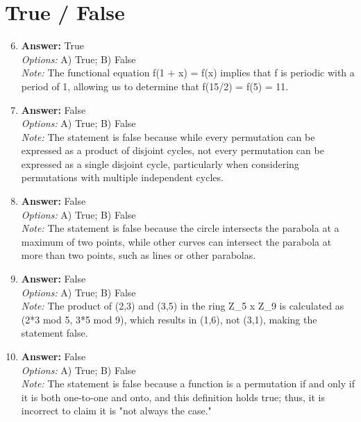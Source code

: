 \documentclass[12pt]{article}
\begin{document}
\section*{True / False}
\begin{enumerate}[label=\arabic*.]
\setcounter{enumi}{5}
\item \textbf{Answer:} True
\\ \textit{Options:} A) True; B) False
\\ \textit{Note:} The functional equation f(1 + x) = f(x) implies that f is periodic with a period of 1, allowing us to determine that f(15/2) = f(5) = 11.
\item \textbf{Answer:} False
\\ \textit{Options:} A) True; B) False
\\ \textit{Note:} The statement is false because while every permutation can be expressed as a product of disjoint cycles, not every permutation can be expressed as a single disjoint cycle, particularly when considering permutations with multiple independent cycles.
\item \textbf{Answer:} False
\\ \textit{Options:} A) True; B) False
\\ \textit{Note:} The statement is false because the circle intersects the parabola at a maximum of two points, while other curves can intersect the parabola at more than two points, such as lines or other parabolas.
\item \textbf{Answer:} False
\\ \textit{Options:} A) True; B) False
\\ \textit{Note:} The product of (2,3) and (3,5) in the ring Z\_5 x Z\_9 is calculated as (2*3 mod 5, 3*5 mod 9), which results in (1,6), not (3,1), making the statement false.
\item \textbf{Answer:} False
\\ \textit{Options:} A) True; B) False
\\ \textit{Note:} The statement is false because a function is a permutation if and only if it is both one-to-one and onto, and this definition holds true; thus, it is incorrect to claim it is "not always the case."
\end{enumerate}
\end{document}
